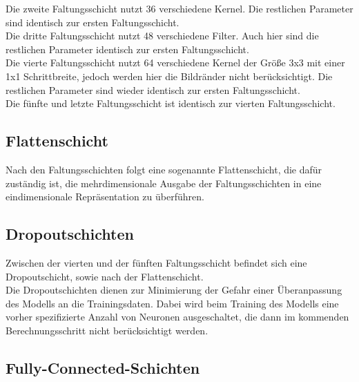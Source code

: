 Die zweite Faltungsschicht nutzt 36 verschiedene Kernel. Die restlichen Parameter sind identisch zur ersten Faltungsschicht. \\

Die dritte Faltungsschicht nutzt 48 verschiedene Filter. Auch hier sind die restlichen Parameter identisch zur ersten Faltungsschicht. \\

Die vierte Faltungsschicht nutzt 64 verschiedene Kernel der Größe 3x3 mit einer 1x1 Schrittbreite, jedoch werden hier die Bildränder nicht berücksichtigt. Die restlichen Parameter sind wieder identisch zur ersten Faltungsschicht. \\

Die fünfte und letzte Faltungsschicht ist identisch zur vierten Faltungsschicht.

\subsection{Flattenschicht}

Nach den Faltungsschichten folgt eine sogenannte Flattenschicht, die dafür zuständig ist, die mehrdimensionale Ausgabe der Faltungsschichten  in eine eindimensionale Repräsentation zu überführen. \cite{hhu}

\subsection{Dropoutschichten}

Zwischen der vierten und der fünften Faltungsschicht befindet sich eine Dropoutschicht, sowie nach der Flattenschicht. \\ Die Dropoutschichten dienen zur Minimierung der Gefahr einer Überanpassung des Modells an die Trainingsdaten. Dabei wird beim Training des Modells eine vorher spezifizierte Anzahl von Neuronen ausgeschaltet, die dann im kommenden Berechnungsschritt nicht berücksichtigt werden. \cite{wiki2}

\subsection{Fully-Connected-Schichten}

